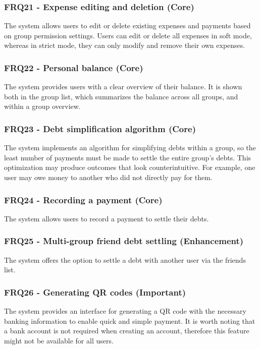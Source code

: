 \documentclass{ctuthesis}
\begin{document}
\subsubsection{FRQ21 - Expense editing and deletion (Core)}
The system allows users to edit or delete existing expenses and payments based on group permission settings. Users can edit or delete all expenses in soft mode, whereas in strict mode, they can only modify and remove their own expenses.

\subsubsection{FRQ22 - Personal balance (Core)}
The system provides users with a clear overview of their balance. It is shown both in the group list, which summarizes the balance across all groups, and within a group overview.

\subsubsection{FRQ23 - Debt simplification algorithm (Core)}
The system implements an algorithm for simplifying debts within a group, so the least number of payments must be made to settle the entire group's debts. This optimization may produce outcomes that look counterintuitive. For example, one user may owe money to another who did not directly pay for them.

\subsubsection{FRQ24 - Recording a payment (Core)}
The system allows users to record a payment to settle their debts.

\subsubsection{FRQ25 - Multi-group friend debt settling (Enhancement)}
The system offers the option to settle a debt with another user via the friends list.

\subsubsection{FRQ26 - Generating QR codes (Important)}
The system provides an interface for generating a QR code with the necessary banking information to enable quick and simple payment. It is worth noting that a bank account is not required when creating an account, therefore this feature might not be available for all users.
\end{document}

